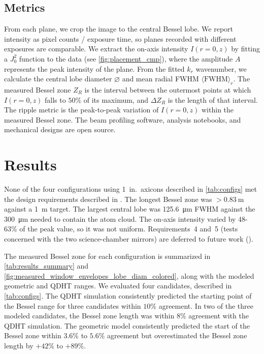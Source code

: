 \documentclass[
  aps,
  twocolumn,
  reprint,              %
  superscriptaddress,
  amsmath,
  amssymb,
  floatfix,
  longbibliography,      %
  nofootinbib %
]{revtex4-2}
\begin{document}
\subsection{Metrics}\label{sec:metrics}
From each plane, we crop the image to the central Bessel lobe. We report intensity as pixel counts / exposure time, so planes recorded with different exposures are comparable. We extract the on-axis intensity $I(r=0, z)$ by fitting a $J_0^2$ function to the data (see \autoref{fig:placement_cmp}), where the amplitude $A$ represents the peak intensity of the plane. From the fitted $k_r$ wavenumber, we calculate the central lobe diameter $\varnothing$ and mean radial FWHM $\langle \mathrm{FWHM} \rangle_r$. The measured Bessel zone $Z_R$ is the interval between the outermost points at which $I(r=0, z)$ falls to $50\%$ of its maximum, and $\Delta Z_R$ is the length of that interval. The ripple metric is the peak-to-peak variation of $I(r=0, z)$ within the measured Bessel zone.
The beam profiling software, analysis notebooks, and mechanical designs are open source\footnotemark[2].



\section{Results}\label{sec:results}

None of the four configurations using 1~in.\ axicons described in
\autoref{tab:configs} met the design requirements described in
.
The longest Bessel zone was ${>}\SI{0.83}{\meter}$ against a
\SI{1}{\meter} target. The largest central lobe was
\SI{125.6}{\micro\meter} FWHM against the \SI{300}{\micro\meter}
needed to contain the atom cloud. The on-axis intensity varied by
48-63\% of the peak value, so it was not uniform. Requirements~4
and~5 (tests concerned with the two science-chamber mirrors) are deferred to future work ().

The measured Bessel zone for each configuration is summarized in \autoref{tab:results_summary} and \autoref{fig:measured_window_envelopes_lobe_diam_colored}, along with the modeled geometric and QDHT ranges. We evaluated four candidates, described in \autoref{tab:configs}. The QDHT simulation consistently predicted the starting point of the Bessel range for three candidates within $10\%$ agreement. In two of the three modeled candidates, the Bessel zone length was within $8\%$ agreement with the QDHT simulation. The geometric model consistently predicted the start of the Bessel zone within $3.6\%$ to $5.6\%$ agreement but overestimated the Bessel zone length by $+42\%$ to $+89\%$.
\end{document}
